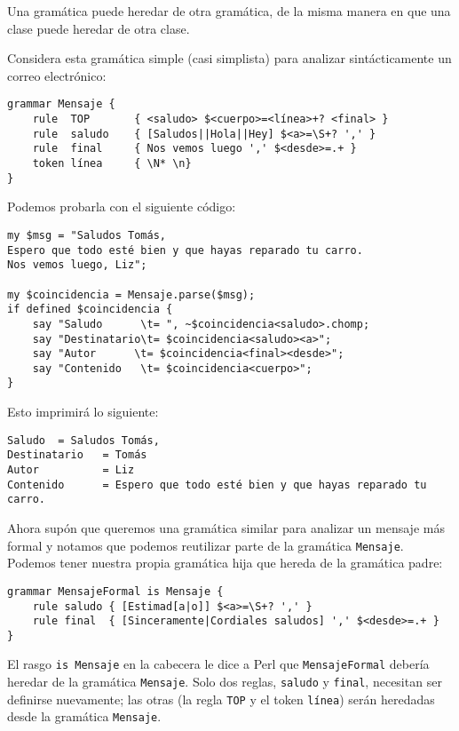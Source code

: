 Una gramática puede heredar de otra gramática, 
de la misma manera en que una clase puede 
heredar de otra clase.

Considera esta gramática simple (casi simplista) para 
analizar sintácticamente un correo electrónico:

\begin{verbatim}
grammar Mensaje {
    rule  TOP       { <saludo> $<cuerpo>=<línea>+? <final> }
    rule  saludo    { [Saludos||Hola||Hey] $<a>=\S+? ',' }
    rule  final     { Nos vemos luego ',' $<desde>=.+ }
    token línea     { \N* \n}
}
\end{verbatim}

Podemos probarla con el siguiente código:

\begin{verbatim}
my $msg = "Saludos Tomás,
Espero que todo esté bien y que hayas reparado tu carro.
Nos vemos luego, Liz";

my $coincidencia = Mensaje.parse($msg);
if defined $coincidencia { 
    say "Saludo 	 \t= ", ~$coincidencia<saludo>.chomp;
    say "Destinatario\t= $coincidencia<saludo><a>";
    say "Autor   	\t= $coincidencia<final><desde>";
    say "Contenido   \t= $coincidencia<cuerpo>";
}
\end{verbatim}

Esto imprimirá lo siguiente:

\begin{verbatim}
Saludo 	= Saludos Tomás,
Destinatario   = Tomás
Autor          = Liz
Contenido      = Espero que todo esté bien y que hayas reparado tu carro.
\end{verbatim}

Ahora supón que queremos una gramática similar para analizar
un mensaje más formal y notamos que podemos reutilizar parte
de la gramática {\tt Mensaje}. Podemos tener nuestra propia
gramática hija que hereda de la gramática padre:

\begin{verbatim}
grammar MensajeFormal is Mensaje {
    rule saludo { [Estimad[a|o]] $<a>=\S+? ',' }
    rule final  { [Sinceramente|Cordiales saludos] ',' $<desde>=.+ }
}
\end{verbatim}

El rasgo {\tt is Mensaje} en la cabecera le dice a Perl que 
{\tt MensajeFormal} debería heredar de la gramática {\tt Mensaje}.
Solo dos reglas, {\tt saludo} y {\tt final}, necesitan ser
definirse nuevamente; las otras (la regla {\tt TOP} y el token
{\tt línea}) serán heredadas desde la gramática {\tt Mensaje}.

